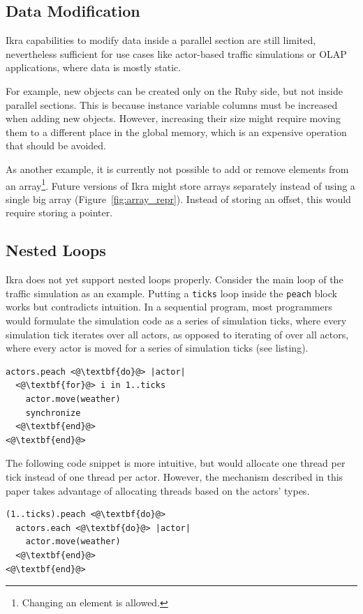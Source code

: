 \documentclass[preprint]{sigplanconf}
\begin{document}
\subsection{Data Modification}
\label{sec:gen_new_obj}
Ikra capabilities to modify data inside a parallel section are still limited, nevertheless sufficient for use cases like actor-based traffic simulations or OLAP applications, where data is mostly static.

For example, new objects can be created only on the Ruby side, but not inside parallel sections. This is because instance variable columns must be increased when adding new objects. However, increasing their size might require moving them to a different place in the global memory, which is an expensive operation that should be avoided.

As another example, it is currently not possible to add or remove elements from an array\footnote{Changing an element is allowed.}. Future versions of Ikra might store arrays separately instead of using a single big array (Figure~\ref{fig:array_repr}). Instead of storing an offset, this would require storing a pointer.

\subsection{Nested Loops}
\label{sec:nested_loops}
Ikra does not yet support nested loops properly. Consider the main loop of the traffic simulation as an example. Putting a \texttt{ticks} loop inside the \texttt{peach} block works but contradicts intuition. In a sequential program, most programmers would formulate the simulation code as a series of simulation ticks, where every simulation tick iterates over all actors, as opposed to iterating of over all actors, where every actor is moved for a series of simulation ticks (see listing).

\begin{lstlisting}
actors.peach <@\textbf{do}@> |actor|
  <@\textbf{for}@> i in 1..ticks
    actor.move(weather)
    synchronize
  <@\textbf{end}@>
<@\textbf{end}@>
\end{lstlisting}

The following code snippet is more intuitive, but would allocate one thread per tick instead of one thread per actor. However, the mechanism described in this paper takes advantage of allocating threads based on the actors' types.
\begin{lstlisting}
(1..ticks).peach <@\textbf{do}@>
  actors.each <@\textbf{do}@> |actor|
    actor.move(weather)
  <@\textbf{end}@>
<@\textbf{end}@>
\end{lstlisting}
\end{document}
